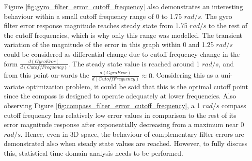 Figure \ref{fig:gyro_filter_error_cutoff_frequency} also demonstrates an interesting behaviour within a small cutoff frequency range of 0 to 1.75 $rad/s$. The gyro filter error response magnitude reaches steady state from 1.75 $rad/s$ to the rest of the cutoff frequencies, which is why only this range was modelled. The transient variation of the magnitude of the error in this graph within 0 and 1.25 $rad/s$ could be considered as differential change due to cutoff frequency change in the form $\frac{d(GyroEror)}{d(CutoffFrequency)}$. The steady state value is reached around 1 $rad/s$, and from this point on-wards the $\frac{d(GyroEror)}{d(CutoffFrequency)} \approx 0$. Considering this as a uni-variate optimization problem, it could be said that this is the optimal cutoff point since the compass is designed to operate adequately at lower frequencies. Also observing Figure \ref{fig:compass_filter_error_cutoff_frequency}, a 1 $rad/s$ compass cutoff frequency has relatively low error values in comparison to the rest of its error magnitude response after exponentially decreasing from a maximum near 0 $rad/s$. Hence, even in 3D space, the behaviour of complementary filter errors are demonstrated also when steady state values are reached. However, to fully discuss this, statistical time domain analysis needs to be performed.


